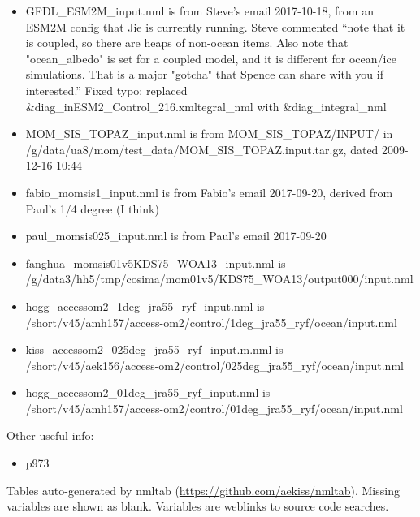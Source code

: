 \documentclass[10pt]{article}
\newcommand{\nmllink}[2]{#1} %
\newcommand{\nml}[1]{{\footnotesize\textsf{}}}
\begin{document}
\begin{itemize}
\item GFDL_ESM2M_input.nml is from Steve's email 2017-10-18, from an ESM2M config that Jie is currently running. Steve commented ``note that it is coupled, so there are heaps of non-ocean items.  Also note that "ocean_albedo" is set for a coupled model, and it is different for ocean/ice simulations.  That is a major "gotcha" that Spence can share with you if interested.'' Fixed typo: replaced 
\&diag_inESM2_Control_216.xmltegral_nml
with
 \&diag_integral_nml

\item MOM_SIS_TOPAZ_input.nml is from MOM_SIS_TOPAZ/INPUT/ in\\ /g/data/ua8/mom/test_data/MOM_SIS_TOPAZ.input.tar.gz, dated 2009-12-16 10:44
\item fabio_momsis1_input.nml is from Fabio's email 2017-09-20, derived from Paul's 1/4 degree (I think)
\item paul_momsis025_input.nml is from Paul's email 2017-09-20
\item fanghua_momsis01v5KDS75_WOA13_input.nml is \\ /g/data3/hh5/tmp/cosima/mom01v5/KDS75_WOA13/output000/input.nml
\item hogg_accessom2_1deg_jra55_ryf_input.nml is \\ /short/v45/amh157/access-om2/control/1deg_jra55_ryf/ocean/input.nml
\item kiss_accessom2_025deg_jra55_ryf_input.m.nml is \\ /short/v45/aek156/access-om2/control/025deg_jra55_ryf/ocean/input.nml
\item hogg_accessom2_01deg_jra55_ryf_input.nml is \\ /short/v45/amh157/access-om2/control/01deg_jra55_ryf/ocean/input.nml
\end{itemize}

Other useful info:
\begin{itemize}
\item \citet{GriffiesWintonAndersonBensonDelworthDufourDunneGoddardMorrison2015a} p973
\end{itemize}

\renewcommand{\nmllink}[2]{\href{https://github.com/mom-ocean/MOM5/search?q=#2}{#1}} %
Tables auto-generated by nmltab (\url{https://github.com/aekiss/nmltab}).
Missing variables are shown as blank. Variables are \textcolor{link}{weblinks} to source code searches.
\end{document}
